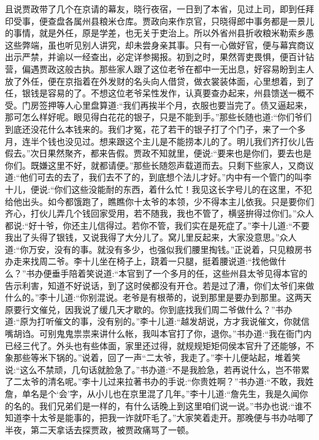 \begin{parag}
    且说贾政带了几个在京请的幕友，晓行夜宿，一日到了本省，见过上司，即到任拜印受事，便查盘各属州县粮米仓库。贾政向来作京官，只晓得郎中事务都是一景儿的事情，就是外任，原是学差，也无关于吏治上。所以外省州县折收粮米勒索乡愚这些弊端，虽也听见别人讲究，却未尝身亲其事。只有一心做好官，便与幕宾商议出示严禁，并谕以一经查出，必定详参揭报。初到之时，果然胥吏畏惧，便百计钻营，偏遇贾政这般古执。那些家人跟了这位老爷在都中一无出息，好容易盼到主人放了外任，便在京指着在外发财的名头向人借贷，做衣裳装体面，心里想着，到了任，银钱是容易的了。不想这位老爷呆性发作，认真要查办起来，州县馈送一概不受。门房签押等人心里盘算道:“我们再挨半个月，衣服也要当完了。债又逼起来，那可怎么样好呢。眼见得白花花的银子，只是不能到手。”那些长随也道:“你们爷们到底还没花什么本钱来的。我们才冤，花了若干的银子打了个门子，来了一个多月，连半个钱也没见过。想来跟这个主儿是不能捞本儿的了。明儿我们齐打伙儿告假去。”次日果然聚齐，都来告假。贾政不知就里，便说:“要来也是你们，要去也是你们。既嫌这里不好，就都请便。”那些长随怨声载道而去。只剩下些家人，又商议道:“他们可去的去了，我们去不了的，到底想个法儿才好。”内中有一个管门的叫李十儿，便说:“你们这些没能耐的东西，着什么忙！我见这长字号儿的在这里，不犯给他出头。如今都饿跑了，瞧瞧你十太爷的本领，少不得本主儿依我。只是要你们齐心，打伙儿弄几个钱回家受用，若不随我，我也不管了，横竖拚得过你们。”众人都说:“好十爷，你还主儿信得过。若你不管，我们实在是死症了。”李十儿道:“不要我出了头得了银钱，又说我得了大分儿了。窝儿里反起来，大家没意思。”众人道:“你万安，没有的事。就没有多少，也强似我们腰里掏钱。”正说着，只见粮房书办走来找周二爷。李十儿坐在椅子上，跷着一只腿，挺着腰说道:“找他做什么？”书办便垂手陪着笑说道:“本官到了一个多月的任，这些州县太爷见得本官的告示利害，知道不好说话，到了这时侯都没有开仓。若是过了漕，你们太爷们来做什么的。”李十儿道:“你别混说。老爷是有根蒂的，说到那里是要办到那里。这两天原要行文催兑，因我说了缓几天才歇的。你到底找我们周二爷做什么？”书办道:“原为打听催文的事，没有别的。”李十儿道:“越发胡说，方才我说催文，你就信嘴胡诌。可别鬼鬼祟祟来讲什么帐，我叫本官打了你，退你。”书办道:“我在衙门内已经三代了。外头也有些体面，家里还过得，就规规矩矩伺侯本官升了还能够，不象那些等米下锅的。”说着，回了一声“二太爷，我走了。”李十儿便站起，堆着笑说:“这么不禁顽，几句话就脸急了。”书办道:“不是我脸急，若再说什么，岂不带累了二太爷的清名呢。”李十儿过来拉著书办的手说:“你贵姓啊？”书办道:“不敢，我姓詹，单名是个‘会’字，从小儿也在京里混了几年。”李十儿道:“詹先生，我是久闻你的名的。我们兄弟们是一样的，有什么话晚上到这里咱们说一说。”书办也说:“谁不知道李十太爷是能事的，把我一诈就吓毛了。”大家笑着走开。那晚便与书办咕唧了半夜，第二天拿话去探贾政，被贾政痛骂了一顿。
\end{parag}


